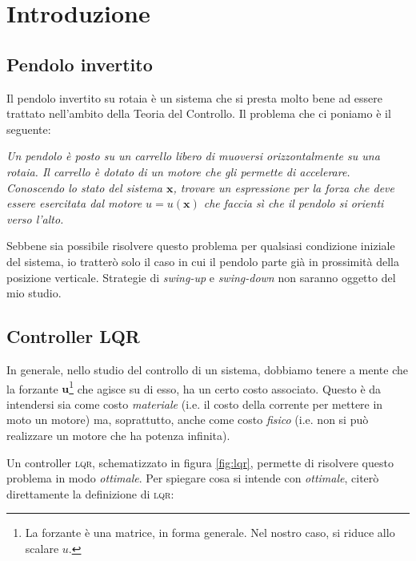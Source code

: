 \section{Introduzione}\label{sec:introduzione}
\subsection{Pendolo invertito}\label{subsec:intro-pendolo}
Il pendolo invertito su rotaia è un sistema che si presta molto bene ad essere trattato nell'ambito della Teoria del
Controllo.
Il problema che ci poniamo è il seguente:
\begin{framed}
\emph{
    Un pendolo è posto su un carrello libero di muoversi orizzontalmente su una rotaia.
    Il carrello è dotato di un motore che gli permette di accelerare. Conoscendo lo stato del sistema
    $\mathbf x$, trovare un espressione per la forza che deve essere esercitata dal motore $u = u(\mathbf x)$
    che faccia sì che il pendolo si orienti verso l'alto.
  }
\end{framed}
Sebbene sia possibile risolvere questo problema per qualsiasi condizione iniziale del sistema, io tratterò solo il
caso in cui il pendolo parte già in prossimità della posizione verticale. Strategie di \emph{swing-up} e
\emph{swing-down} non saranno oggetto del mio studio.

\subsection{Controller \textsc{LQR}}\label{subsec:intro-lqr}
In generale, nello studio del controllo di un sistema, dobbiamo tenere a mente che la forzante
$\mathbf u$\footnote{La forzante è una matrice, in forma generale. Nel nostro caso, si riduce allo scalare $u$.}
che agisce su di esso, ha un certo costo associato.
Questo è da intendersi sia come costo \emph{materiale} (i.e. il costo della corrente per mettere in moto
un motore) ma, soprattutto, anche come costo \emph{fisico} (i.e. non si può realizzare un motore che ha potenza
infinita).

Un controller \textsc{lqr}, schematizzato in figura \ref{fig:lqr}, permette di risolvere questo problema in modo \emph{ottimale}.
Per spiegare cosa si intende con \emph{ottimale}, citerò direttamente la definizione di \textsc{lqr}:

